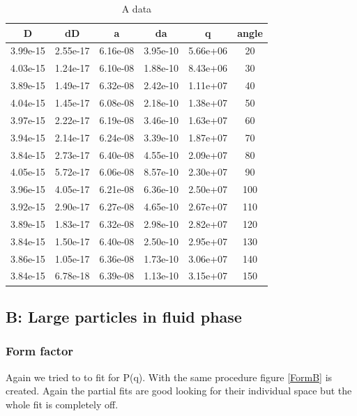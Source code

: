 \documentclass[]{article}
\begin{document}
\begin{table}[!htbp]
	\centering
	\begin{tabular}{|c|c|c|c|c|c|}
		\hline
		D & dD & a & da & q & angle \\ \hline\hline
		3.99e-15 & 2.55e-17 & 6.16e-08 & 3.95e-10 & 5.66e+06 & 20 \\ \hline
		4.03e-15 & 1.24e-17 & 6.10e-08 & 1.88e-10 & 8.43e+06 & 30 \\ \hline
		3.89e-15 & 1.49e-17 & 6.32e-08 & 2.42e-10 & 1.11e+07 & 40 \\ \hline
		4.04e-15 & 1.45e-17 & 6.08e-08 & 2.18e-10 & 1.38e+07 & 50 \\ \hline
		3.97e-15 & 2.22e-17 & 6.19e-08 & 3.46e-10 & 1.63e+07 & 60 \\ \hline
		3.94e-15 & 2.14e-17 & 6.24e-08 & 3.39e-10 & 1.87e+07 & 70 \\ \hline
		3.84e-15 & 2.73e-17 & 6.40e-08 & 4.55e-10 & 2.09e+07 & 80 \\ \hline
		4.05e-15 & 5.72e-17 & 6.06e-08 & 8.57e-10 & 2.30e+07 & 90 \\ \hline
		3.96e-15 & 4.05e-17 & 6.21e-08 & 6.36e-10 & 2.50e+07 & 100 \\ \hline
		3.92e-15 & 2.90e-17 & 6.27e-08 & 4.65e-10 & 2.67e+07 & 110 \\ \hline
		3.89e-15 & 1.83e-17 & 6.32e-08 & 2.98e-10 & 2.82e+07 & 120 \\ \hline
		3.84e-15 & 1.50e-17 & 6.40e-08 & 2.50e-10 & 2.95e+07 & 130 \\ \hline
		3.86e-15 & 1.05e-17 & 6.36e-08 & 1.73e-10 & 3.06e+07 & 140 \\ \hline
		3.84e-15 & 6.78e-18 & 6.39e-08 & 1.13e-10 & 3.15e+07 & 150 \\ \hline
		\hline
	\end{tabular}
	\caption{A data}
	\label{tab:adata}
\end{table}


\subsection{B: Large particles in fluid phase}
\subsubsection{Form factor}
Again we tried to to fit for P(q). With the same procedure figure \ref{FormB} is created. Again the partial fits are good looking for their individual space but the whole fit is completely off.
\end{document}
